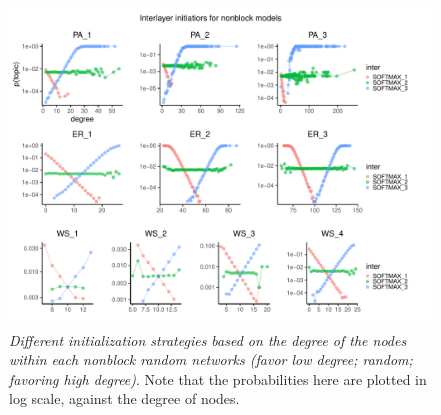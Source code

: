 \begin{figure}[!ht]
    \centering
    \includegraphics[width=\textwidth]{../figures/report/FigS1.pdf}
    \caption{\label{supp:1}
    \textit{Different initialization strategies based on the degree of the nodes within each nonblock random networks (favor low degree; random; favoring high degree)}. Note that the probabilities here are plotted in log scale, against the degree of nodes.
    }
\end{figure}